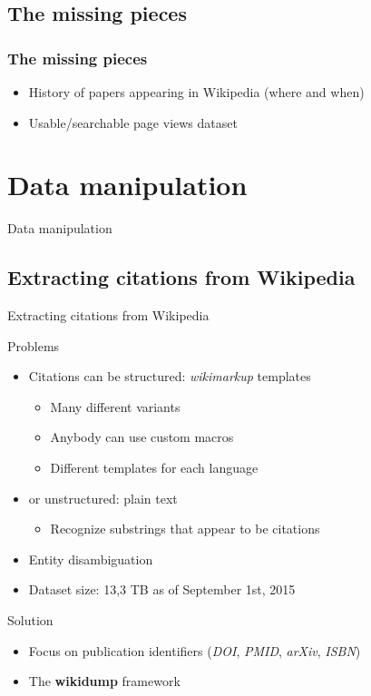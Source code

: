 \documentclass{beamer}
\begin{document}
\subsection{The missing pieces}
\begin{frame}
\frametitle{The missing pieces}
\begin{itemize}
    \item History of papers appearing in Wikipedia (where and when)
    \item Usable/searchable page views dataset
\end{itemize}
\end{frame}

\section{Data manipulation}

\begin{frame}[c]
\Huge{\centerline{Data manipulation}}
\end{frame}

\subsection{Extracting citations from Wikipedia}
\begin{frame}{Extracting citations from Wikipedia}
    \begin{block}{Problems}
        \begin{itemize}
            \item Citations can be structured: \emph{wikimarkup} templates
            \begin{itemize}
                \item Many different variants
                \item Anybody can use custom macros
                \item Different templates for each language
            \end{itemize}
            \item or unstructured: plain text
            \begin{itemize}
                \item Recognize substrings that appear to be citations
            \end{itemize}
            \item Entity disambiguation
            \item Dataset size: 13,3 TB as of September 1st, 2015
        \end{itemize}
    \end{block}
    \begin{block}{Solution}
        \begin{itemize}
            \item Focus on publication identifiers (\emph{DOI}, \emph{PMID}, \emph{arXiv}, \emph{ISBN})
            \item The \textbf{wikidump} framework
        \end{itemize}
    \end{block}
\end{frame}
\end{document}
